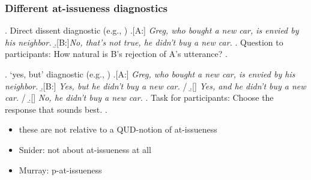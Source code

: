 \documentclass[compress, xcolor = dvipsnames, aspectratio=169]{beamer}
\begin{document}
	\begin{frame}[t]\frametitle{Different at-issueness diagnostics}\scriptsize

		  \ex. \label{dd} Direct dissent diagnostic (e.g., \citealt{tonhauser_diagnosing_2012,syrett_experimental_2015})
		    \a.[A:] \emph{Greg, who bought a new car, is envied by his neighbor.}
		    \b.[B:]\emph{No, that's not true, he didn't buy a new car.}
		    \z.
		  Question to participants: How natural is B's rejection of A's utterance?
		  \z.
		  \vspace{-1.5\baselineskip}

		  \ex. \label{yesbut}%
		    `yes, but' diagnostic (e.g., \citealt{xue_correlation_2011,destruel_cross-linguistic_2015})
		    \a.[A:] \emph{Greg, who bought a new car, is envied by his neighbor.}
		    \b.[B:] \emph{Yes, but he didn't buy a new car.} /
		    \b.[] \emph{Yes, and he didn't buy a new car.} /
		    \b.[] \emph{No, he didn't buy a new car.}
		    \z.
		    Task for participants: Choose the response that sounds best.
		  \z.

		\begin{itemize}
			\item these are not relative to a QUD-notion of at-issueness \citealt{snider_anaphoric_2017,snider_at-issuenessne_2017,snider_distinguishing_2018,koev_notions_2018,faller_discourse_2019,korotkova_evidential_2020}
			\item Snider: not about at-issueness at all
			\item Murray: p-at-issueness
		\end{itemize}
	
	\end{frame}
\end{document}
